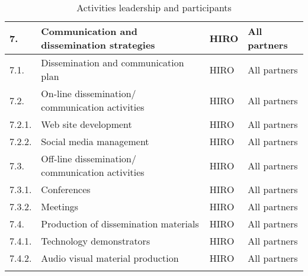 \begin{longtable}[H]{p{1.5cm} >{\raggedright\arraybackslash}p{4cm} >{\raggedright\arraybackslash}p{3.8cm} >{\raggedright\arraybackslash}p{4cm}}
	\midrule
	
	7. & Communication and dissemination strategies & HIRO & All partners\vspace{0.2cm} \\
	
	\midrule
	
	7.1. & Dissemination and communication plan & HIRO & All partners\vspace{0.2cm} \\
	
	\midrule
	
	7.2. & On-line dissemination/ communication activities & HIRO & All partners\vspace{0.2cm} \\
	
	\midrule
	
	7.2.1. & Web site development & HIRO & All partners\vspace{0.2cm} \\
	
	\midrule
	
	7.2.2. & Social media management & HIRO & All partners\vspace{0.2cm} \\
	
	\midrule
	
	7.3. & Off-line dissemination/ communication activities & HIRO & All partners\vspace{0.2cm} \\
	
	\midrule
	
	7.3.1. & Conferences & HIRO & All partners\vspace{0.2cm} \\
	
	\midrule
	
	7.3.2. & Meetings & HIRO & All partners\vspace{0.2cm} \\
	
	\midrule
	
	7.4. & Production of dissemination materials & HIRO & All partners\vspace{0.2cm} \\
	
	\midrule
	 
	7.4.1. & Technology demonstrators & HIRO & All partners\vspace{0.2cm} \\
	
	\midrule
	
	7.4.2. & Audio visual material production & HIRO & All partners\vspace{0.2cm} \\
	
	\bottomrule[2pt]
	
\caption{Activities leadership and participants}
\end{longtable}